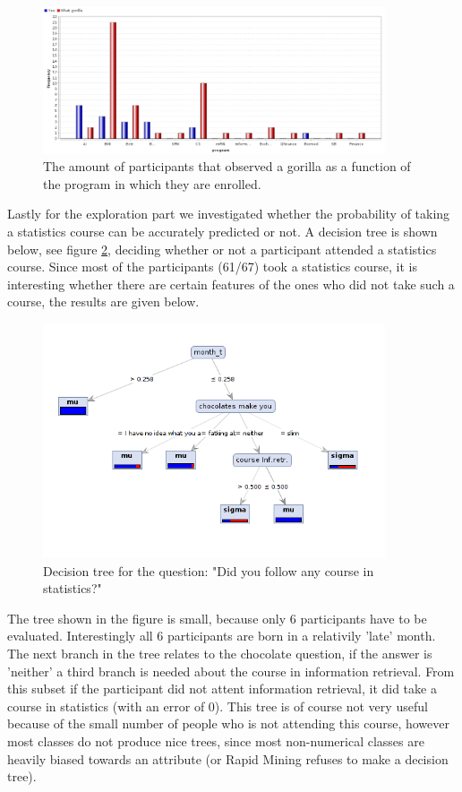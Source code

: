 \documentclass[11pt,a4paper,onecolumn]{article}
\begin{document}
\begin{figure}[H]
  \centering
  \includegraphics[width=0.9\textwidth]{gorilla.png}
  \caption{The amount of participants that observed a gorilla as a function of the program in which they are enrolled.}
  \label{fig:gorilla}
\end{figure}

Lastly for the exploration part we investigated whether the probability of taking a statistics course can be accurately predicted or not. A decision tree is shown below, see figure \ref{fig:stat}, deciding whether or not a participant attended a statistics course. Since most of the participants (61/67) took a statistics course, it is interesting whether there are certain features of the ones who did not take such a course, the results are given below.

\begin{figure}[h]
  \centering
  \includegraphics[width=0.9\textwidth]{statistics.png}
  \caption{Decision tree for the question: "Did you follow any course in statistics?"}
  \label{fig:stat}
\end{figure}

The tree shown in the figure is small, because only 6 participants have to be evaluated. Interestingly all 6 participants are born in a relativily 'late' month. The next branch in the tree relates to the chocolate question, if the answer is 'neither' a third branch is needed about the course in information retrieval. From this subset if the participant did not attent information retrieval, it did take a course in statistics (with an error of 0). This tree is of course not very useful because of the small number of people who is not attending this course, however most classes do not produce nice trees, since most non-numerical classes are heavily biased towards an attribute (or Rapid Mining refuses to make a decision tree).
\end{document}
